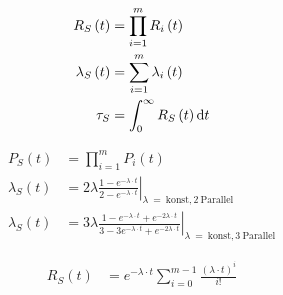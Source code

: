\begin{boxleft}
\end{boxleft}\begin{boxrightshaded}
\begin{align*}
    R_S\left(t\right)&=\prod_{i=1}^m R_i\left(t\right)\\
    \lambda_S\left(t\right)&=\sum_{i=1}^m \lambda_i\left(t\right)\\
    \tau_S &= \int_0^\infty R_S\left(t\right)\mathop{}\!\mathrm{d} t
\end{align*}
\end{boxrightshaded}


\begin{boxleft}
\end{boxleft}\begin{boxrightshaded}
\begin{align*}
    P_S\left(t\right)&=\prod_{i=1}^m P_i\left(t\right)\\
    \lambda_S\left(t\right)&= \left.2\lambda \frac{1-e^{-\lambda\cdot t}}{2-e^{-\lambda\cdot t}}\right|_{\lambda~=~\text{konst}, 2~\text{Parallel}}\\
    \lambda_S\left(t\right)&= \left.3\lambda \frac{1-e^{-\lambda\cdot t}+e^{-2\lambda\cdot t}}{3-3e^{-\lambda\cdot t}+e^{-2\lambda\cdot t}}\right|_{\lambda~=~\text{konst}, 3~\text{Parallel}}
\end{align*}
\end{boxrightshaded}

\begin{boxleft}
\end{boxleft}\begin{boxrightshaded}
\begin{align*}
    R_S\left(t\right)&= e^{-\lambda\cdot t}\sum_{i=0}^{m-1}\frac{\left(\lambda\cdot t\right)^i}{i!}
\end{align*}
\end{boxrightshaded}

